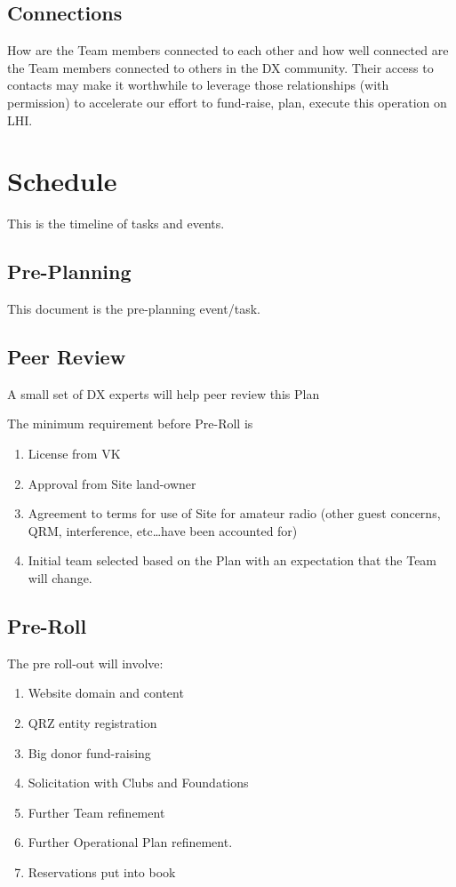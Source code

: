 \documentclass[11pt]{article}
\begin{document}
\subsection{Connections}
How are the Team members connected to each other and
how well connected are the Team members connected to
others in the DX community.  Their access to contacts
may make it worthwhile to leverage those relationships
(with permission) to accelerate our effort to 
fund-raise, plan, execute this operation on LHI.

\section{Schedule}

This is the timeline of tasks and events.

\subsection{Pre-Planning}

This document is the pre-planning event/task.

\subsection{Peer Review}

A small set of DX experts will help peer review this Plan

The minimum requirement before Pre-Roll is
\begin{enumerate}
\item License from VK
\item Approval from Site land-owner
\item Agreement to terms for use of Site for amateur radio (other
guest concerns, QRM, interference, etc\ldots have been accounted for)
\item Initial team selected based on the Plan with an expectation that
the Team will change.
\end{enumerate}

\subsection{Pre-Roll}

The pre roll-out will involve:
\begin{enumerate}
\item Website domain and content
\item QRZ entity registration
\item Big donor fund-raising
\item Solicitation with Clubs and Foundations
\item Further Team refinement
\item Further Operational Plan refinement.
\item Reservations put into book
\end{enumerate}
\end{document}
